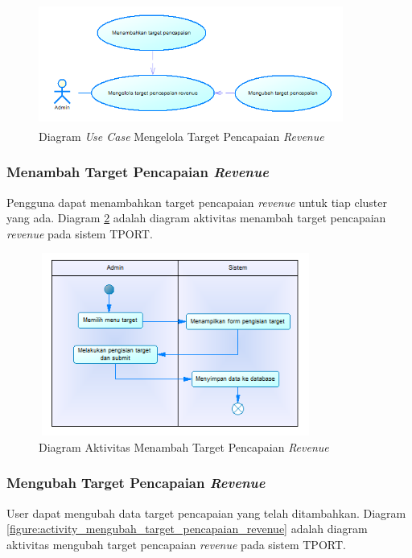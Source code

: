 	\begin{figure}[h]
		\centerline {\includegraphics[width=10cm,height=4cm]{bab4/use_case_mengelola_target_pencapaian_revenue.png}}
		\caption{Diagram \textit{Use Case} Mengelola Target Pencapaian \textit{Revenue}}
		\label{figure:use_case_mengelola_target_pencapaian}
	\end{figure}

\subsubsection{Menambah Target Pencapaian \textit{Revenue}}
Pengguna dapat menambahkan target pencapaian \textit{revenue} untuk tiap cluster yang ada. Diagram \ref{figure:activity_menambah_target_pencapaian_revenue} adalah diagram aktivitas menambah target pencapaian \textit{revenue} pada sistem TPORT.
	
	\begin{figure}[h]
	\centerline {\includegraphics[width=9cm,height=6cm]{bab4/activity_menambah_target_pencapaian_revenue.png}}
	\caption{Diagram Aktivitas Menambah Target Pencapaian \textit{Revenue}}
	\label{figure:activity_menambah_target_pencapaian_revenue}
	\end{figure}
		
\subsubsection{Mengubah Target Pencapaian \textit{Revenue}}
User dapat mengubah data target pencapaian yang telah ditambahkan. Diagram \ref{figure:activity_mengubah_target_pencapaian_revenue} adalah diagram aktivitas mengubah target pencapaian \textit{revenue} pada sistem TPORT.
	
